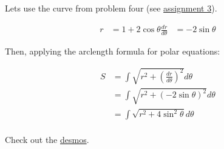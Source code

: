 \documentclass[letterpaper]{article}
\begin{document}
Lets use the curve from problem four (see \href{KBe21math520retAssign3.org}{assignment 3}).


\[\begin{aligned}
  r &= 1 + 2 \cos  \theta 
  \frac{dr}{d\theta } &= - 2 \sin  \theta 
  \end{aligned}\]

Then, applying the arclength formula for polar equations:

\[\begin{aligned}
  S &= \int \sqrt{r^2 + \left( \frac{dr}{d\theta } \right)  ^2} d\theta \\
  &=  \int \sqrt{r^2 + \left( -2 \sin  \theta  \right)  ^2} d\theta \\
  &=  \int \sqrt{r^2 + 4 \sin^2 \theta } d\theta \\
  \end{aligned}\]

Check out the \href{https://www.desmos.com/calculator/gfaoi1he0p}{desmos}.
\end{document}
